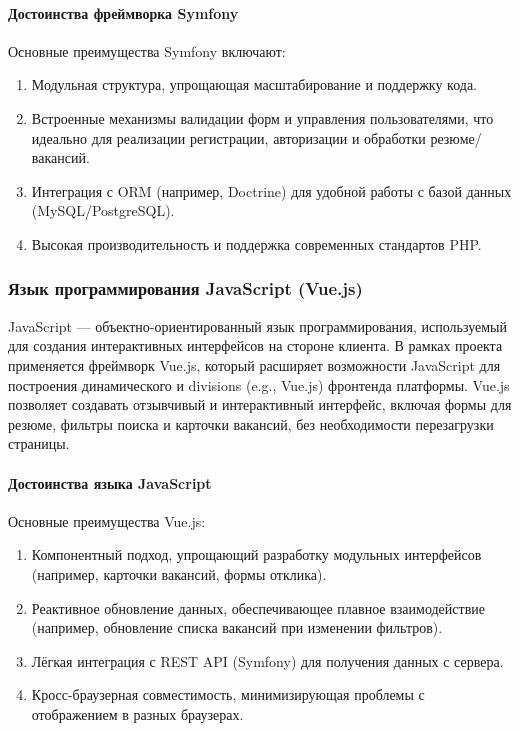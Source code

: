 \paragraph{Достоинства фреймворка Symfony}

Основные преимущества Symfony включают:

\begin{enumerate}
	\item Модульная структура, упрощающая масштабирование и поддержку кода.
	\item Встроенные механизмы валидации форм и управления пользователями, что идеально для реализации регистрации, авторизации и обработки резюме/вакансий.
	\item Интеграция с ORM (например, Doctrine) для удобной работы с базой данных (MySQL/PostgreSQL).
	\item Высокая производительность и поддержка современных стандартов PHP.
\end{enumerate}


\subsubsection{Язык программирования JavaScript (Vue.js)}

JavaScript — объектно-ориентированный язык программирования, используемый для создания интерактивных интерфейсов на стороне клиента. В рамках проекта применяется фреймворк Vue.js, который расширяет возможности JavaScript для построения динамического и divisions (e.g., Vue.js) фронтенда платформы. Vue.js позволяет создавать отзывчивый и интерактивный интерфейс, включая формы для резюме, фильтры поиска и карточки вакансий, без необходимости перезагрузки страницы.

\paragraph{Достоинства языка JavaScript}

Основные преимущества Vue.js:

\begin{enumerate}
	\item Компонентный подход, упрощающий разработку модульных интерфейсов (например, карточки вакансий, формы отклика).
	\item Реактивное обновление данных, обеспечивающее плавное взаимодействие (например, обновление списка вакансий при изменении фильтров).
	\item Лёгкая интеграция с REST API (Symfony) для получения данных с сервера.
	\item Кросс-браузерная совместимость, минимизирующая проблемы с отображением в разных браузерах.
\end{enumerate}


